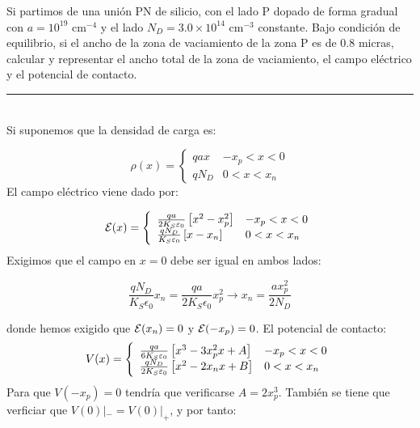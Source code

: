 Si partimos de una unión PN de silicio, con el lado P dopado de forma gradual con 
$a = 10^{19}$ cm$^{-4}$ y el lado $N_D = 3.0 \times 10^{14}$ cm$^{-3}$ constante. 
Bajo condición de equilibrio, si el ancho de la zona de vaciamiento de la zona P es 
de 0.8 micras, calcular y representar el ancho total de la zona de vaciamiento, 
el campo eléctrico y el potencial de contacto.



\rule{\textwidth}{0.1pt} \\[2pt]

Si suponemos que la densidad de carga es:

\begin{equation*}
    \rho (x) = \left\lbrace \begin{array}{ll}
        q a x & -x_p < x < 0  \\ 
        q N_D & 0 < x < x_n  
    \end{array} \right.
\end{equation*}
El campo eléctrico viene dado por:

\begin{equation*}
    \mathcal{E} (x) =  \left\lbrace \begin{array}{ll}
        \frac{qa}{2K_S\varepsilon_0} \left[ x^2 - x_p^2 \right] & -x_p < x < 0  \\ 
        \frac{qN_D}{K_S\varepsilon_0} \left[ x- x_n \right] & 0 < x < x_n  
    \end{array} \right.
\end{equation*}
Exigimos que el campo en $x=0$ debe ser igual en ambos lados:

\begin{equation}
    \frac{qN_D}{K_S \epsilon_0} x_n = \frac{qa}{2K_S\epsilon_0} x_p^2 \rightarrow x_n = \frac{a x_p^2}{2 N_D}
\end{equation}


donde hemos exigido que $\mathcal{E}(x_n)=0$ y $\mathcal{E}(-x_p)=0$. El potencial de contacto:
\begin{equation*}
    V (x) =  \left\lbrace \begin{array}{ll}
        \frac{qa}{6K_S\varepsilon_0} \left[ x^3 - 3x_p^2 x + A \right] & -x_p < x < 0  \\ 
        \frac{qN_D}{2K_S\varepsilon_0} \left[ x^2 - 2x_n x + B \right] & 0 < x < x_n  
    \end{array} \right.
\end{equation*}
Para que $V(-x_p)=0$ tendría que verificarse $A=2x_p^3$. También se tiene que verficiar que $V(0)|_{-}=V(0)|_{+}$, y por tanto: 

